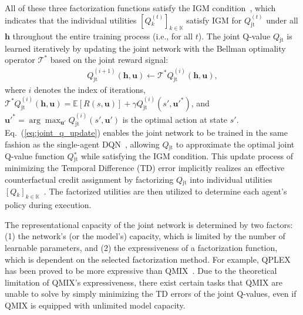 \documentclass[twoside,11pt]{article}
\newcommand{\state}{s}
\newcommand{\jointaction}{\mathbf{u}}
\newcommand{\rewardfunction}{R}
\newcommand{\jointobservationhistory}{\mathbf{h}}
\newcommand{\agentspace}{\mathbb{K}}
\newcommand{\agentcounter}{k}
\newcommand{\utilityexp}{Q}
\newcommand{\joint}{\mathrm{jt}}
\newcommand{\iter}{i}
\newcounter{example0}
\begin{document}
All of these three factorization functions satisfy the IGM condition~\citep{Son2019QTRAN}, which indicates that the individual utilities $[\utilityexp{}^{(t)}_\agentcounter{}]_{\agentcounter{}\in\agentspace{}}$ satisfy IGM for $\utilityexp{}^{(t)}_{\joint{}}$ under all $\jointobservationhistory{}$ throughout the entire training process (i.e., for all $t$). The joint Q-value $\utilityexp{}_{\joint{}}$ is learned iteratively by updating the joint network with the Bellman optimality operator $\mathcal{T}^*$ based on the joint reward signal:
\begin{align}
    \utilityexp{}^{(\iter+1)}_{\joint{}}(\jointobservationhistory{},\jointaction{}) \leftarrow \mathcal{T}^*\utilityexp{}^{(\iter)}_{\joint{}}(\jointobservationhistory{},\jointaction{}),
\label{eq:joint_q_update}
\end{align}
where $\iter$ denotes the index of iterations, $\mathcal{T}^*\utilityexp{}^{(\iter)}_{\joint{}}(\jointobservationhistory{},\jointaction{}) = \mathbb{E}[\rewardfunction{}(\state{},\jointaction{})]+\gamma \utilityexp{}^{(\iter)}_{\joint{}}(\state{}',\jointaction{}'^*)$, and $\jointaction{}'^*=\arg\max_{\jointaction'}\utilityexp{}^{(\iter)}_{\joint{}}(\state{}',\jointaction')$ is the optimal action at state $\state{}'$. Eq.~(\ref{eq:joint_q_update}) enables the joint network to be trained in the same fashion as the single-agent DQN~\citep{Mnih2015DQN}, allowing $\utilityexp{}_{\joint{}}$ to approximate the optimal joint Q-value function $\utilityexp{}^*_{\joint{}}$ while satisfying the IGM condition. This update process of minimizing the Temporal Difference (TD) error implicitly realizes an effective counterfactual credit assignment by factorizing $\utilityexp{}_{\joint{}}$ into individual utilities $[\utilityexp{}_\agentcounter{}]_{\agentcounter{}\in\agentspace{}}$~\citep{wang2021towards}.
The factorized utilities are then utilized to determine each agent's policy during execution.

The representational capacity of the joint network is determined by two factors: (1) the network's (or the model's) capacity, which is limited by the number of learnable parameters, and (2) the expressiveness of a factorization function, which is dependent on the selected factorization method.
For example, QPLEX has been proved to be more expressive than QMIX~\citep{Wang2020QPLEX}. Due to the theoretical limitation of QMIX's expressiveness, there exist certain tasks that QMIX are unable to solve by simply minimizing the TD errors of the joint Q-values, even if QMIX is equipped with unlimited model capacity.
\end{document}
